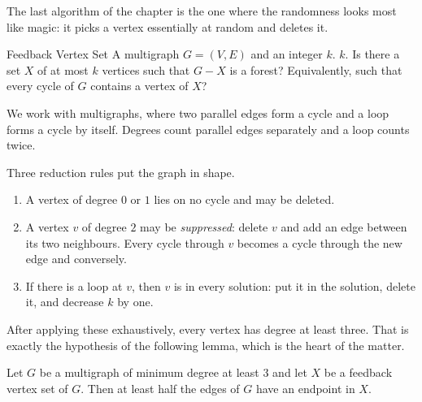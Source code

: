 The last algorithm of the chapter is the one where the randomness looks most
like magic: it picks a vertex essentially at random and deletes it.

\begin{probdef}{Feedback Vertex Set}
  \instance A multigraph $G = (V,E)$ and an integer $k$.
  \parameter $k$.
  \question Is there a set $X$ of at most $k$ vertices such that $G - X$ is a
  forest? Equivalently, such that every cycle of $G$ contains a vertex of $X$?
\end{probdef}

We work with multigraphs, where two parallel edges form a cycle and a loop
forms a cycle by itself. Degrees count parallel edges separately and a loop
counts twice.

Three reduction rules put the graph in shape.

\begin{observation}\label{obs:fvs-reductions}
\begin{enumerate}[label=(\roman*),leftmargin=*,nosep]
  \item A vertex of degree $0$ or $1$ lies on no cycle and may be deleted.
  \item A vertex $v$ of degree $2$ may be \emph{suppressed}: delete $v$ and add
        an edge between its two neighbours. Every cycle through $v$ becomes a
        cycle through the new edge and conversely.
  \item If there is a loop at $v$, then $v$ is in every solution: put it in the
        solution, delete it, and decrease $k$ by one.
\end{enumerate}
\end{observation}

After applying these exhaustively, every vertex has degree at least three. That
is exactly the hypothesis of the following lemma, which is the heart of the
matter.

\begin{lemma}\label{lem:fvs-half-edges}
Let $G$ be a multigraph of minimum degree at least $3$ and let $X$ be a feedback
vertex set of $G$. Then at least half the edges of $G$ have an endpoint in $X$.
\end{lemma}

